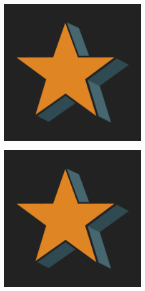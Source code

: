 \thispagestyle{empty}
{
\selectfont %


\hspace{-0.5cm}
\begin{figure}
  \begin{subfigure}{0.45\textwidth}
    \centering
    \includegraphics[width=0.8\textwidth]{assets/images/logo.png}
  \end{subfigure}
  \begin{subfigure}{0.45\textwidth}
    \centering
    \includegraphics[width=0.8\textwidth]{assets/images/logo.png}

\end{subfigure}
\end{figure}}
